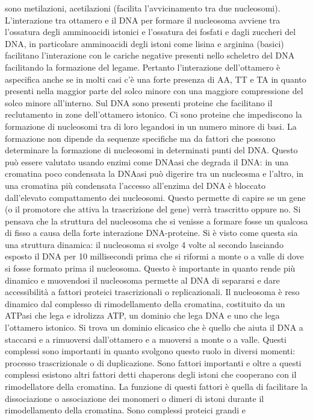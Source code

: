 sono metilazioni, acetilazioni (facilita l'avvicinamento tra due nucleosomi). L'interazione tra ottamero e il DNA per formare il nucleosoma avviene tra l'ossatura degli amminoacidi 
istonici e l'ossatura dei fosfati e dagli zuccheri del DNA, in particolare amminoacidi degli istoni come lisina e arginina (basici) facilitano l'interazione con le cariche negative 
presenti nello scheletro del DNA facilitando la formazione del legame. Pertanto l'interazione dell'ottamero \`e aspecifica anche se in molti casi c'\`e una forte presenza di AA, TT e TA
in quanto presenti nella maggior parte del solco minore con una maggiore compressione del solco minore all'interno. Sul DNA sono presenti proteine che facilitano il reclutamento in zone
dell'ottamero istonico. Ci sono proteine che impediscono la formazione di nucleosomi tra di loro legandosi in un numero minore di basi. La formazione non dipende da sequenze specifiche
ma da fattori che possono determinare la formazione di nucleosomi in determinati punti del DNA. Questo pu\`o essere valutato usando enzimi come DNAasi che degrada il DNA: in una cromatina
poco condensata la DNAasi pu\`o digerire tra un nucleosma e l'altro, in una cromatina pi\`u condensata l'accesso all'enzima del DNA \`e bloccato dall'elevato compattamento dei nucleosomi.
Questo permette di capire se un gene (o il promotore che attiva la trascrizione del gene) verr\`a trascritto oppure no. Si pensava che la struttura del nucleosoma che si venisse a 
formare fosse un qualcosa di fisso a causa della forte interazione DNA-proteine. Si \`e visto come questa sia una struttura dinamica: il nucleosoma si svolge 4 volte al secondo lasciando
esposto il DNA per 10 millisecondi prima che si riformi a monte o a valle di dove si fosse formato prima il nucleosoma. Questo \`e importante in quanto rende pi\`u dinamico e muovendosi
il nucleosoma permette al DNA di separarsi e dare accessibilit\`a a fattori proteici trascrizionali o replicazionali. Il nucleosoma \`e reso dinamico dal complesso di rimodellamento della
cromatina, costituito da un ATPasi che lega e idrolizza ATP, un dominio che lega DNA e uno che lega l'ottamero istonico. Si trova un dominio elicasico che \`e quello che aiuta il DNA a 
staccarsi e a rimuoversi dall'ottamero e a muoversi a monte o a valle. Questi complessi sono importanti in quanto svolgono questo ruolo in diversi momenti: processo trascrizionale o 
di duplicazione. Sono fattori importanti e oltre a questi complessi esistono altri fattori detti chaperons degli istoni che cooperano con il rimodellatore della cromatina. La funzione di 
questi fattori \`e quella di facilitare la dissociazione o associazione dei monomeri o dimeri di istoni durante il rimodellamento della cromatina. Sono complessi proteici grandi e 
